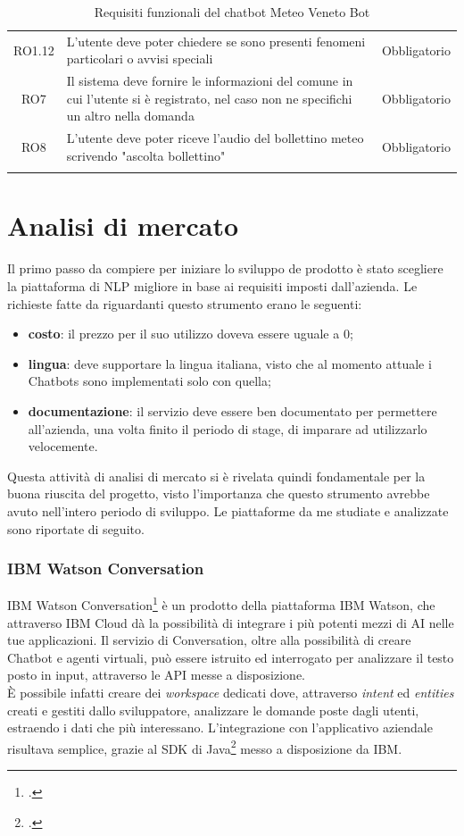 \begin{longtable}{|c|>{\centering}m{7cm}|c|}
RO1.12 & L'utente deve poter chiedere se sono presenti fenomeni particolari o avvisi speciali & Obbligatorio\\ 
RO7 & Il sistema deve fornire le informazioni del comune in cui l'utente si è registrato, nel caso non ne specifichi un altro nella domanda & Obbligatorio\\
RO8 & L'utente deve poter riceve l'audio del bollettino meteo scrivendo "ascolta bollettino" & Obbligatorio\\ 
\hline
\caption{Requisiti funzionali del chatbot Meteo Veneto Bot}
\end{longtable}

\section{Analisi di mercato}
\label{nlp}
Il primo passo da compiere per iniziare lo sviluppo de prodotto è stato scegliere la piattaforma di \gls{NLP} migliore in base ai requisiti imposti dall'azienda. Le richieste fatte da \azienda{} riguardanti questo strumento erano le seguenti:
\begin{itemize}
	\item \textbf{costo}: il prezzo per il suo utilizzo doveva essere uguale a 0;
	\item \textbf{lingua}: deve supportare la lingua italiana, visto che al momento attuale i \glspl{Chatbot} sono implementati solo con quella;
	\item \textbf{documentazione}: il servizio deve essere ben documentato per permettere all'azienda, una volta finito il periodo di stage, di imparare ad utilizzarlo velocemente.
\end{itemize}

Questa attività di analisi di mercato si è rivelata quindi fondamentale per la buona riuscita del progetto, visto l'importanza che questo strumento avrebbe avuto nell'intero periodo di sviluppo. Le piattaforme da me studiate e analizzate sono riportate di seguito.

\subsubsection{IBM Watson Conversation}
IBM Watson Conversation\footcite{watson} è un prodotto della piattaforma IBM Watson, che attraverso IBM Cloud dà la possibilità di integrare i più potenti mezzi di \gls{AI} nelle tue applicazioni. Il servizio di Conversation, oltre alla possibilità di creare \gls{Chatbot} e agenti virtuali, può essere istruito ed interrogato per analizzare il testo posto in input, attraverso le \gls{API} messe a disposizione.\\
È possibile infatti creare dei \emph{workspace} dedicati dove, attraverso \emph{intent} ed \emph{entities} creati e gestiti dallo sviluppatore, analizzare le domande poste dagli utenti, estraendo i dati che più interessano. L'integrazione con l'applicativo aziendale risultava semplice, grazie al \gls{SDK} di Java\footcite{watsonSDK} messo a disposizione da IBM.

